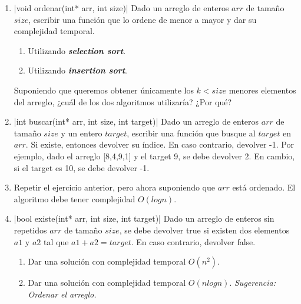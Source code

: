 \documentclass[titlepage,oneside]{book}
\begin{document}
\begin{enumerate}
    \item{}|void ordenar(int* arr, int size)|
    Dado un arreglo de enteros $arr$ de tamaño $size$, escribir una función que lo ordene de menor a mayor y dar su complejidad temporal.
    \begin{enumerate}
     \item Utilizando \textbf{\textit{selection sort}}.
     \item Utilizando \textbf{\textit{insertion sort}}. 
    \end{enumerate}

    Suponiendo que queremos obtener únicamente los $k < size$ menores elementos del arreglo, ¿cuál de los dos algoritmos utilizaría? ¿Por qué?

    \item{}|int buscar(int* arr, int size, int target)|
    Dado un arreglo de enteros $arr$ de tamaño $size$ y un entero $target$,
    escribir una función que busque al $target$ en $arr$. Si existe, entonces devolver su índice. En caso contrario, devolver -1. \newline Por ejemplo, dado el arreglo [8,4,9,1] y el target 9, se debe devolver 2. En cambio, si el target es 10, se debe devolver -1.

    \item Repetir el ejercicio anterior, pero ahora suponiendo que $arr$ está ordenado. El algoritmo debe tener complejidad $O(log{}n)$.

    \item{}|bool existe(int* arr, int size, int target)|
    Dado un arreglo de enteros sin repetidos $arr$ de tamaño $size$, se debe devolver true si existen dos elementos $a1$ y $a2$ tal que $a1 + a2 = target$. En caso contrario, devolver false.
    \begin{enumerate}
        \item Dar una solución con complejidad temporal $O(n^2)$.
        \item Dar una solución con complejidad temporal $O(n logn)$. \newline\textit{Sugerencia: Ordenar el arreglo.}
    \end{enumerate}


\end{enumerate}
\end{document}
